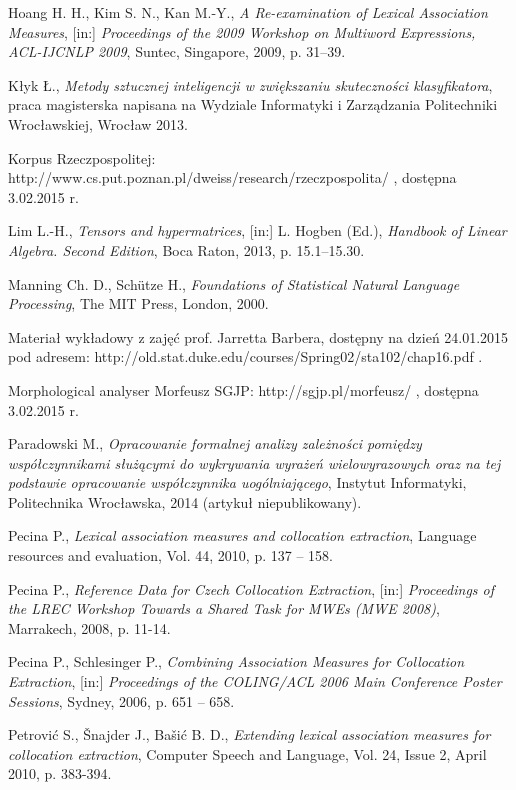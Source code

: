 \begin{thebibliography}{9}
Hoang H. H., Kim S. N., Kan M.-Y.,
\emph{A Re-examination of Lexical Association Measures}, [in:]
\emph{Proceedings of the 2009 Workshop on Multiword Expressions, ACL-IJCNLP 2009}, Suntec, Singapore, 2009, p. 31–39. 

Kłyk Ł., \emph{Metody sztucznej inteligencji w zwiększaniu skuteczności klasyfikatora}, praca magisterska napisana na Wydziale Informatyki i Zarządzania Politechniki Wrocławskiej, Wrocław 2013.

Korpus Rzeczpospolitej: http://www.cs.put.poznan.pl/dweiss/research/rzeczpospolita/ , dostępna 3.02.2015 r.

Lim L.-H., \emph{Tensors and hypermatrices}, [in:] L. Hogben (Ed.), \emph{Handbook of Linear Algebra. Second Edition}, Boca Raton, 2013, p. 15.1–15.30.

Manning Ch. D., Schütze H., \emph{Foundations of Statistical Natural Language Processing}, The MIT Press, London, 2000.

Materiał wykładowy z zajęć prof. Jarretta Barbera, dostępny na dzień 24.01.2015 pod adresem: http://old.stat.duke.edu/courses/Spring02/sta102/chap16.pdf .
	
Morphological analyser Morfeusz SGJP: http://sgjp.pl/morfeusz/ , dostępna 3.02.2015 r.	

Paradowski M., \emph{Opracowanie formalnej analizy zależności pomiędzy współczynnikami służącymi do wykrywania wyrażeń wielowyrazowych oraz na tej podstawie opracowanie współczynnika uogólniającego}, Instytut Informatyki, Politechnika Wrocławska, 2014 (artykuł niepublikowany).

Pecina P., \emph{Lexical association measures and collocation extraction}, Language resources and evaluation, Vol. 44, 2010, p. 137 – 158.

Pecina P., \emph{Reference Data for Czech Collocation Extraction}, [in:] \emph{Proceedings of the LREC Workshop Towards a Shared Task for MWEs (MWE 2008)}, Marrakech, 2008, p. 11-14.

Pecina P., Schlesinger P., \emph{Combining Association Measures for Collocation Extraction}, [in:] \emph{Proceedings of the COLING/ACL 2006 Main Conference Poster Sessions}, Sydney, 2006, p. 651 – 658.

Petrović S., Šnajder J., Bašić B. D., \emph{Extending lexical association measures for collocation extraction}, Computer Speech and Language, Vol. 24, Issue 2, April 2010, p. 383-394.
	 

\end{thebibliography}
